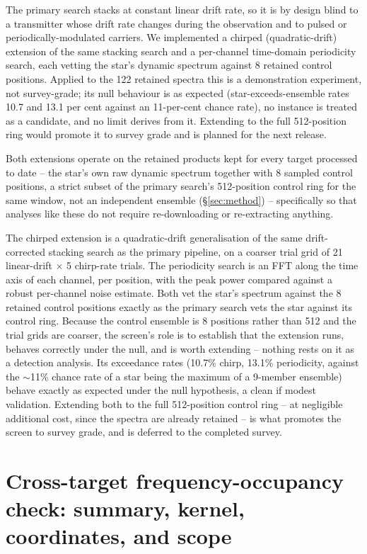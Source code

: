 \documentclass{openjournal}
\begin{document}
The primary search stacks at constant linear drift rate, so it is by
design blind to a transmitter whose drift rate changes during the
observation and to pulsed or periodically-modulated carriers. We
implemented a chirped (quadratic-drift) extension of the same
stacking search and a per-channel time-domain periodicity search,
each vetting the star's dynamic spectrum against 8 retained control
positions. Applied to the 122 retained spectra this is a
demonstration experiment, not survey-grade;
its null behaviour is as expected
(star-exceeds-ensemble rates 10.7 and 13.1 per cent against an
11-per-cent chance rate), no instance is treated as a candidate, and
no limit derives from it. Extending to the full 512-position ring
would promote it to survey grade and is planned for the next
release.

Both extensions operate on the retained products
kept for every target processed to date -- the star's own raw dynamic
spectrum together with 8 sampled control positions, a strict subset of
the primary search's 512-position control ring for the same window,
not an independent ensemble (\S\ref{sec:method}) -- specifically so
that analyses like these do not require re-downloading or
re-extracting anything.

The chirped extension is a quadratic-drift generalisation of the same
drift-corrected stacking search as the primary pipeline, on a coarser
trial grid of 21 linear-drift $\times$ 5 chirp-rate trials. The
periodicity search is an FFT along the time axis of each channel, per
position, with the peak power compared against a robust per-channel
noise estimate. Both vet the star's spectrum against the 8 retained
control positions exactly as the primary search vets the star against
its control ring. Because the control ensemble is 8 positions rather
than 512 and the trial grids are coarser, the screen's role is to
establish that the extension runs, behaves correctly under the null,
and is worth extending -- nothing rests on it as a detection analysis.
Its exceedance rates (10.7\% chirp, 13.1\% periodicity, against the
$\sim$11\% chance rate of a star being the maximum of a 9-member
ensemble) behave exactly as expected under the null hypothesis, a
clean if modest validation. Extending both to the full 512-position
control ring -- at negligible additional cost, since the spectra are
already retained -- is what promotes the screen to survey grade, and
is deferred to the completed survey.

\section{Cross-target frequency-occupancy check: summary, kernel, coordinates, and scope}
\label{app:freqoccupancy}
\end{document}
